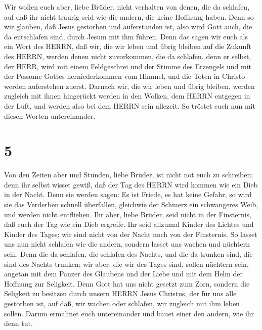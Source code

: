  Wir wollen euch aber, liebe Brüder, nicht verhalten von
denen, die da schlafen, auf daß ihr nicht traurig seid wie die andern,
die keine Hoffnung haben.  Denn so wir glauben, daß Jesus
gestorben und auferstanden ist, also wird Gott auch, die da entschlafen
sind, durch Jesum mit ihm führen.  Denn das sagen wir euch
als ein Wort des HERRN, daß wir, die wir leben und übrig bleiben auf die
Zukunft des HERRN, werden denen nicht zuvorkommen, die da schlafen.
 denn er selbst, der HERR, wird mit einem Feldgeschrei und
der Stimme des Erzengels und mit der Posaune Gottes herniederkommen vom
Himmel, und die Toten in Christo werden auferstehen zuerst.
 Darnach wir, die wir leben und übrig bleiben, werden
zugleich mit ihnen hingerückt werden in den Wolken, dem HERRN entgegen
in der Luft, und werden also bei dem HERRN sein allezeit. 
So tröstet euch nun mit diesen Worten untereinander.

\hypertarget{section-4}{%
\section{5}\label{section-4}}

 Von den Zeiten aber und Stunden, liebe Brüder, ist nicht
not euch zu schreiben;  denn ihr selbst wisset gewiß, daß
der Tag des HERRN wird kommen wie ein Dieb in der Nacht. 
Denn sie werden sagen: Es ist Friede, es hat keine Gefahr, so wird sie
das Verderben schnell überfallen, gleichwie der Schmerz ein schwangeres
Weib, und werden nicht entfliehen.  Ihr aber, liebe Brüder,
seid nicht in der Finsternis, daß euch der Tag wie ein Dieb ergreife.
 Ihr seid allzumal Kinder des Lichtes und Kinder des Tages;
wir sind nicht von der Nacht noch von der Finsternis.  So
lasset uns nun nicht schlafen wie die andern, sondern lasset uns wachen
und nüchtern sein.  Denn die da schlafen, die schlafen des
Nachts, und die da trunken sind, die sind des Nachts trunken;
 wir aber, die wir des Tages sind, sollen nüchtern sein,
angetan mit dem Panzer des Glaubens und der Liebe und mit dem Helm der
Hoffnung zur Seligkeit.  Denn Gott hat uns nicht gesetzt zum
Zorn, sondern die Seligkeit zu besitzen durch unsern HERRN Jesus
Christus,  der für uns alle gestorben ist, auf daß, wir
wachen oder schlafen, wir zugleich mit ihm leben sollen. 
Darum ermahnet euch untereinander und bauet einer den andern, wie ihr
denn tut.

